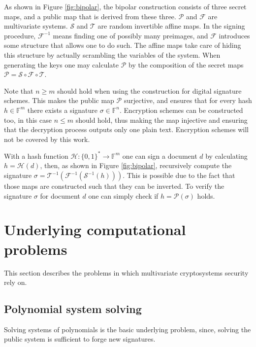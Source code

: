 \documentclass{ufsctex/ufsctex}
\begin{document}
As shown in Figure \ref{fig:bipolar}, the bipolar construction consists of
three secret maps, and a public map that is derived from these three.
$\mathcal{P}$ and $\mathcal{F}$ are multivariate systems. $\mathcal{S}$ and
$\mathcal{T}$ are random invertible affine maps. In the signing procedure,
$\mathcal{F}^{-1}$ means finding one of possibly many preimages, and
$\mathcal{F}$ introduces some structure that allows one to do such. The affine
maps take care of hiding this structure by actually scrambling the variables of
the system. When generating the keys one may calculate $\mathcal{P}$ by the
composition of the secret maps $\mathcal{P} = \mathcal{S} \circ \mathcal{F}
\circ \mathcal{T}$.

Note that $n \geq m$ should hold when using the construction for digital
signature schemes. This makes the public map $\mathcal{P}$ surjective, and
ensures that for every hash $h \in \mathbb{F}^m$ there exists a signature
$\sigma \in \mathbb{F}^n$. Encryption schemes can be constructed too, in this
case $n \leq m$ should hold, thus making the map injective and ensuring that
the decryption process outputs only one plain text. Encryption schemes will not
be covered by this work.

With a hash function $\mathcal{H}:\{0,1\}^* \to \mathbb{F}^m$ one can sign a
document $d$ by calculating $h = \mathcal{H}(d)$, then, as shown in Figure
\ref{fig:bipolar}, recursively compute the signature $\sigma =
\mathcal{T}^{-1}(\mathcal{F}^{-1}(\mathcal{S}^{-1}(h)))$. This is possible due
to the fact that those maps are constructed such that they can be inverted. To
verify the signature $\sigma$ for document $d$ one can simply check if $h =
\mathcal{P}(\sigma)$ holds.

\section{Underlying computational problems}\label{sec:problems}

This section describes the problems in which multivariate cryptosystems
security rely on.

\subsection{Polynomial system solving}\label{sec:posso}

Solving systems of polynomials is the basic underlying problem, since, solving
the public system is sufficient to forge new signatures.
\end{document}
